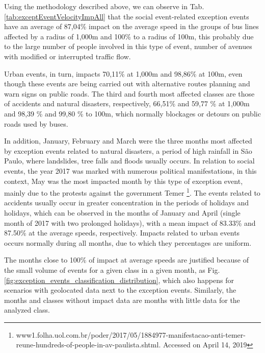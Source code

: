 \documentclass[runningheads]{llncs}
\begin{document}
Using the methodology described above, we can observe in Tab. \ref{tab:exceptEventVelocityImpAll} that the social event-related exception events have an average of 87,04\% impact on the average speed in the groups of bus lines affected by a radius of 1,000m and 100\% to a radius of 100m, this probably due to the large number of people involved in this type of event, number of avenues with modified or interrupted traffic flow.

Urban events, in turn, impacts 70,11\% at 1,000m and 98,86\% at 100m, even though these events are being carried out with alternative routes planning and warn signs on public roads. The third and fourth most affected classes are those of accidents and natural disasters, respectively, 66,51\% and 59,77 \% at 1,000m and 98,39 \% and 99,80 \% to 100m, which normally blockages or detours on public roads used by buses.

In addition, January, February and March were the three months most affected by exception events related to natural disasters, a period of high rainfall in São Paulo, where landslides, tree falls and floods usually occurs. In relation to social events, the year 2017 was marked with numerous political manifestations, in this context, May was the most impacted month by this type of exception event, mainly due to the protests against the government Temer \footnote{{www1.folha.uol.com.br/poder/2017/05/1884977-manifestacao-anti-\newline temer-reune-hundreds-of-people-in-av-paulista.shtml}. Accessed on April 14, 2019}. The events related to accidents usually occur in greater concentration in the periods of holidays and holidays, which can be observed in the months of January and April (single month of 2017 with two prolonged holidays), with a mean impact of 83.33\% and 87.50\% at the average speeds, respectively. Impacts related to urban events occurs normally during all months, due to which they percentages are uniform.

The months close to 100\% of impact at average speeds are justified because of the small volume of events for a given class in a given month, as Fig.\ref{fig:exception_events_classification_distribution}, which also happens for scenarios with geolocated data next to the exception events. Similarly, the months and classes without impact data are months with little data for the analyzed class.
\end{document}
